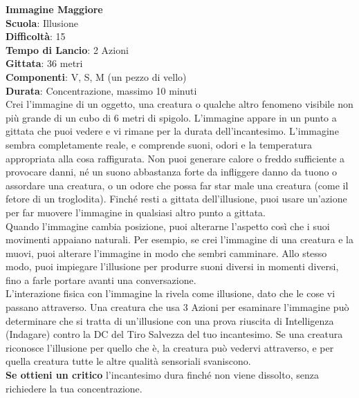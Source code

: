 \begin{multicols}{2}
\medskip\textbf{Immagine Maggiore}\\
\textbf{Scuola}: Illusione\\
\textbf{Difficoltà}:  15\\
\textbf{Tempo di Lancio}: 2 Azioni\\
\textbf{Gittata}: 36 metri\\
\textbf{Componenti}: V, S, M (un pezzo di vello)\\
\textbf{Durata}: Concentrazione, massimo 10 minuti\\
Crei l’immagine di un oggetto, una creatura o qualche altro fenomeno visibile non più grande di un cubo di 6 metri di spigolo. L’immagine appare in un punto a gittata che puoi vedere e vi rimane per la durata dell'incantesimo. L’immagine sembra completamente reale, e comprende suoni, odori e la temperatura appropriata alla cosa raffigurata. Non puoi generare calore o freddo sufficiente a provocare danni, né un suono abbastanza forte da infliggere danno da tuono o assordare una creatura, o un odore che possa far star male una creatura (come il fetore di un troglodita). Finché resti a gittata dell'illusione, puoi usare un'azione per far muovere l’immagine in qualsiasi altro punto a  gittata.\\
Quando l’immagine cambia posizione, puoi alterarne l’aspetto così che i suoi movimenti appaiano naturali. Per esempio, se crei l’immagine di una creatura e la muovi, puoi alterare l’immagine in modo che sembri camminare. Allo stesso modo, puoi impiegare l’illusione per produrre suoni diversi in momenti diversi, fino a farle portare avanti una conversazione.\\
L’interazione fisica con l’immagine la rivela come illusione, dato che le cose vi passano attraverso. Una creatura che usa 3 Azioni per esaminare l’immagine può determinare che si tratta di un'illusione con una prova riuscita di Intelligenza (Indagare) contro la DC del Tiro Salvezza del tuo incantesimo. Se una creatura riconosce l’illusione per quello che è, la creatura può vedervi attraverso, e per quella creatura tutte le altre qualità sensoriali svaniscono.\\
\textbf{Se ottieni un critico} l'incantesimo dura finché non viene dissolto, senza richiedere la tua concentrazione.
	

\end{multicols}
